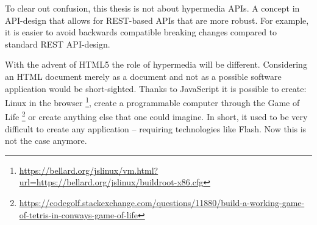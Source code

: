 To clear out confusion, this thesis is not about hypermedia APIs. A concept in API-design that allows for REST-based APIs that are more robust. For example, it is easier to avoid backwards compatible breaking changes compared to standard REST API-design.

With the advent of HTML5 the role of hypermedia will be different. Considering an HTML document merely as a document and not as a possible software application would be short-sighted. Thanks to JavaScript it is possible to create: Linux in the browser \footnote{\url{https://bellard.org/jslinux/vm.html?url=https://bellard.org/jslinux/buildroot-x86.cfg}}, create a programmable computer through the Game of Life \footnote{\url{https://codegolf.stackexchange.com/questions/11880/build-a-working-game-of-tetris-in-conways-game-of-life}} or create anything else that one could imagine. In short, it used to be very difficult to create any application -- requiring technologies like Flash. Now this is not the case anymore.



